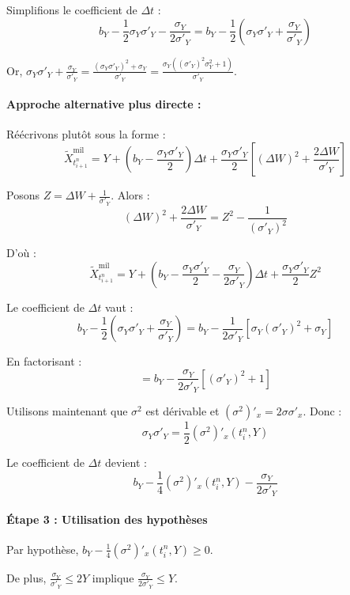 \documentclass[12pt,a4paper]{article}
\theoremstyle{definition}
\theoremstyle{remark}
\begin{document}
Simplifions le coefficient de $\Delta t$ :
\[
b_Y - \frac{1}{2}\sigma_Y \sigma'_Y - \frac{\sigma_Y}{2\sigma'_Y} = b_Y - \frac{1}{2}\left(\sigma_Y \sigma'_Y + \frac{\sigma_Y}{\sigma'_Y}\right)
\]

Or, $\sigma_Y \sigma'_Y + \frac{\sigma_Y}{\sigma'_Y} = \frac{(\sigma_Y \sigma'_Y)^2 + \sigma_Y}{\sigma'_Y} = \frac{\sigma_Y((\sigma'_Y)^2 \sigma^2_Y + 1)}{\sigma'_Y}$.

\paragraph{Approche alternative plus directe :}
Réécrivons plutôt sous la forme :
\begin{equation}
\tilde{X}_{t_{i+1}^n}^{\text{mil}} = Y + \left(b_Y - \frac{\sigma_Y \sigma'_Y}{2}\right)\Delta t + \frac{\sigma_Y \sigma'_Y}{2}\left[(\Delta W)^2 + \frac{2\Delta W}{\sigma'_Y}\right]
\end{equation}

Posons $Z = \Delta W + \frac{1}{\sigma'_Y}$. Alors :
\[
(\Delta W)^2 + \frac{2\Delta W}{\sigma'_Y} = Z^2 - \frac{1}{(\sigma'_Y)^2}
\]

D'où :
\begin{equation}
\tilde{X}_{t_{i+1}^n}^{\text{mil}} = Y + \left(b_Y - \frac{\sigma_Y \sigma'_Y}{2} - \frac{\sigma_Y}{2\sigma'_Y}\right)\Delta t + \frac{\sigma_Y \sigma'_Y}{2}Z^2
\end{equation}

Le coefficient de $\Delta t$ vaut :
\[
b_Y - \frac{1}{2}\left(\sigma_Y \sigma'_Y + \frac{\sigma_Y}{\sigma'_Y}\right) = b_Y - \frac{1}{2\sigma'_Y}[\sigma_Y (\sigma'_Y)^2 + \sigma_Y]
\]

En factorisant :
\[
= b_Y - \frac{\sigma_Y}{2\sigma'_Y}[(\sigma'_Y)^2 + 1]
\]

Utilisons maintenant que $\sigma^2$ est dérivable et $(\sigma^2)'_x = 2\sigma \sigma'_x$. Donc :
\[
\sigma_Y \sigma'_Y = \frac{1}{2}(\sigma^2)'_x(t_i^n, Y)
\]

Le coefficient de $\Delta t$ devient :
\[
b_Y - \frac{1}{4}(\sigma^2)'_x(t_i^n, Y) - \frac{\sigma_Y}{2\sigma'_Y}
\]

\paragraph{Étape 3 : Utilisation des hypothèses}
Par hypothèse, $b_Y - \frac{1}{4}(\sigma^2)'_x(t_i^n, Y) \geq 0$. 

De plus, $\frac{\sigma_Y}{\sigma'_Y} \leq 2Y$ implique $\frac{\sigma_Y}{2\sigma'_Y} \leq Y$.
\end{document}

